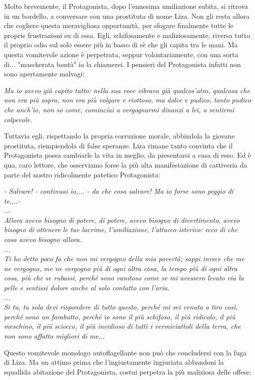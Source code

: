 \documentclass[12pt,a4paper]{report}
\theoremstyle{definition}
\theoremstyle{Theorem}
\theoremstyle{definition}
\theoremstyle{definition}
\theoremstyle{definition}
\begin{document}
Molto brevemente, il Protagonista, dopo l'ennesima umiliazione subita, si ritrova in un bordello, a conversare con una prostituta di nome Liza. Non gli resta allora che cogliere questa meravigliosa opportunità, per sfogare finalmente tutte le proprie frustrazioni su di essa. Egli, schifosamente e maliziosamente, riversa tutto il proprio odio sul solo essere più in basso di sè che gli capita tra le mani. Ma questa vomitevole azione è perpetrata, seppur volontariamente, con una sorta di... "mascherata bontà" io la chiamerei. I pensieri del Protagonista infatti non sono apertamente malvagi:
\begin{center}
	\textit{Ma io avevo già capito tutto: nella sua voce vibrava già qualcos'atro, qualcosa che non era più aspro, non era più volgare e riottoso, ma dolce e pudico, tanto pudico che anch'io, non so come, cominciai a vergognarmi dinanzi a lei, a sentirmi colpevole.}
\end{center}
Tuttavia egli, rispettando la propria corruzione morale, abbindola la giovane prostituta, riempiendola di false speranze. Liza rimane tanto convinta che il Protagonista possa cambiarle la vita in meglio, da presentarsi a casa di esso. Ed è qua, caro lettore, che osserviamo forse la più alta manifestazione di cattiveria da parte del nostro ridicolmente patetico Protagonista:\begin{center}
	\textit{- Salvare! - continuai io,... - da che cosa salvare! Ma io forse sono peggio di te,...-\\...
	\\
Allora avevo bisogno di potere, di potere, avevo bisogno di divertimento, avevo bisogno di ottenere le tue lacrime, l'umiliazione, l'attacco isterico: ecco di che cosa avevo bisogno allora. \\
...
\\
Ti ho detto poco fa che non mi vergogno della mia povertà; sappi invece che me ne vergogno, me ne vergogno più di ogni altra cosa, la tempo più di ogni altra cosa, più che se rubassi, perché sono vanitoso come se mi avessero levato via la pelle e sentissi dolore anche al solo contatto con l'aria.\\
...
\\ Si tu, tu sola devi rispondere di tutto questo, perché mi sei venuta  a tiro così, perché sono un farabutto, perché io sono il più schifoso, il più ridicolo, il più meschino, il più sciocco, il più invidioso di tutti i vermiciattoli della terra, che non sono affatto migliori di me...}
\end{center}
Questo vomitevole monologo autoflagellante non può che concludersi con la fuga di Liza. Ma un attimo prima che l'ingiustamente ingiuriata abbandoni la squallida abitazione del Protagonista, costui perpetra la più maliziosa delle offese:
\end{document}
